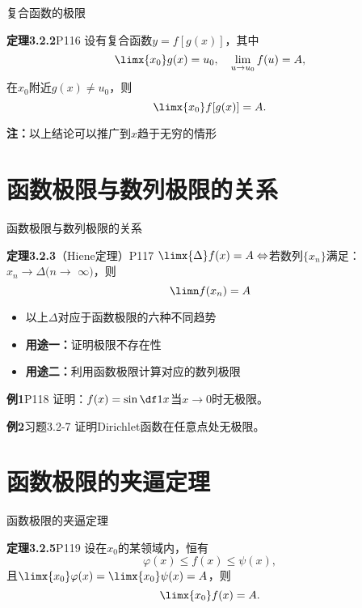 \begin{frame}{复合函数的极限}
	\linespread{1.2}\pause 
	\begin{block}{{\bf 定理3.2.2}\hfill P116}
		设有复合函数$y=f[g(x)]$，其中
		$$\limx{x_0}g(x)=u_0,\quad\lim\limits_{u\to u_0}f(u)=A,$$
		在$x_0$附近$g(x)\ne u_0$，则
		$$\limx{x_0}f[g(x)]=A.$$
	\end{block}\pause 
	{\bf 注：}以上结论可以推广到$x$趋于无穷的情形
\end{frame}

\section{函数极限与数列极限的关系}

\begin{frame}{函数极限与数列极限的关系}
	\linespread{1.2}\pause 
	\begin{block}{{\bf 定理3.2.3}（Hiene定理）\hfill P117}
		$\limx{\Delta}f(x)=A\Leftrightarrow
		$若数列$\{x_n\}$满足：$x_n\to \Delta(n\to$ $\infty)$，则
		$$\limn f(x_n)=A$$
	\end{block}\pause 
	\begin{itemize}
	  \item 以上$\Delta$对应于函数极限的六种不同趋势\pause 
	  \item {\bf 用途一：}证明极限不存在性\pause
	  \item {\bf 用途二：}利用函数极限计算对应的数列极限
	\end{itemize}
\end{frame}

\begin{frame}
	\linespread{1.2}
	\begin{exampleblock}{{\bf 例1}\hfill P118}
		证明：$f(x)=\sin\df 1x$当$x\to 0$时无极限。
	\end{exampleblock}\pause 
	\bigskip
	\begin{exampleblock}{{\bf 例2}\hfill 习题3.2-7}
		证明Dirichlet函数在任意点处无极限。
	\end{exampleblock}
\end{frame}

\section{函数极限的夹逼定理}

\begin{frame}{函数极限的夹逼定理}
	\linespread{1.2}\pause 
	\begin{block}{{\bf 定理3.2.5}\hfill P119}
		设在$x_0$的某领域内，恒有
		$$\varphi(x)\leq f(x)\leq\psi(x), $$
		且$\limx{x_0}\varphi(x)=\limx{x_0}\psi(x)=A$，则
		$$\limx{x_0}f(x)=A.$$
	\end{block}
\end{frame}

